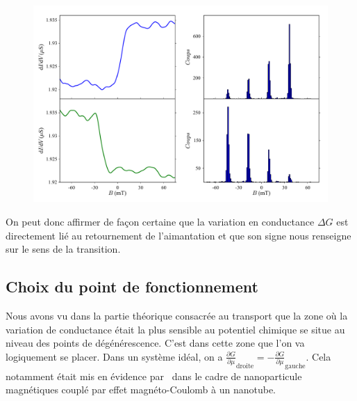 \begin{figure}
\includegraphics[scale=0.5]{Resultats/Chap1/Figure4/figure4.pdf} 
\caption{}
\label{analyse_signe_saut}
\end{figure}

On peut donc affirmer de façon certaine que la variation en conductance $\Delta G$ est directement lié au retournement de l'aimantation et que son signe nous renseigne sur le sens de la transition.

\subsection{Choix du point de fonctionnement}
Nous avons vu dans la partie théorique consacrée au transport que la zone où la variation de conductance était la plus sensible au potentiel chimique se situe au niveau des points de dégénérescence. C'est dans cette zone que l'on va logiquement se placer. Dans un système idéal, on a $\frac{\partial G}{\partial \mu}_{\text{droite}} = -\frac{\partial G}{\partial \mu}_{\text{gauche}} $. Cela notamment était mis en évidence par~\cite{Datta2011} dans le cadre de nanoparticule magnétiques couplé par effet magnéto-Coulomb à un nanotube.

